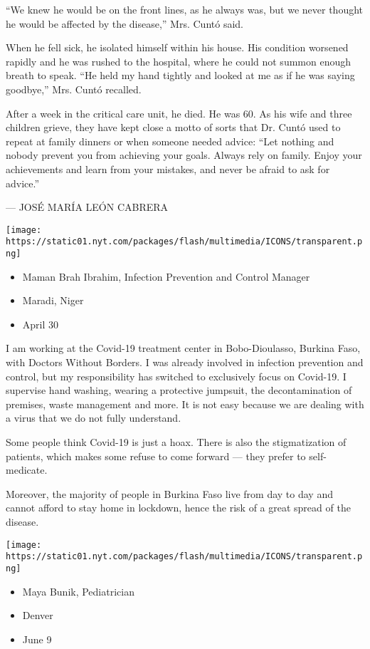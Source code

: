 ``We knew he would be on the front lines, as he always was, but we never
thought he would be affected by the disease,'' Mrs. Cuntó said.

When he fell sick, he isolated himself within his house. His condition
worsened rapidly and he was rushed to the hospital, where he could not
summon enough breath to speak. ``He held my hand tightly and looked at
me as if he was saying goodbye,'' Mrs. Cuntó recalled.

After a week in the critical care unit, he died. He was 60. As his wife
and three children grieve, they have kept close a motto of sorts that
Dr. Cuntó used to repeat at family dinners or when someone needed
advice: ``Let nothing and nobody prevent you from achieving your goals.
Always rely on family. Enjoy your achievements and learn from your
mistakes, and never be afraid to ask for advice.''

--- JOSÉ MARÍA LEÓN CABRERA

\texttt{[image: https://static01.nyt.com/packages/flash/multimedia/ICONS/transparent.png]}

\begin{itemize}
\tightlist
\item
  Maman Brah Ibrahim, Infection Prevention and Control Manager
\item
  Maradi, Niger
\item
  April 30
\end{itemize}

I am working at the Covid-19 treatment center in Bobo-Dioulasso, Burkina
Faso, with Doctors Without Borders. I was already involved in infection
prevention and control, but my responsibility has switched to
exclusively focus on Covid-19. I supervise hand washing, wearing a
protective jumpsuit, the decontamination of premises, waste management
and more. It is not easy because we are dealing with a virus that we do
not fully understand.

Some people think Covid-19 is just a hoax. There is also the
stigmatization of patients, which makes some refuse to come forward ---
they prefer to self-medicate.

Moreover, the majority of people in Burkina Faso live from day to day
and cannot afford to stay home in lockdown, hence the risk of a great
spread of the disease.

\texttt{[image: https://static01.nyt.com/packages/flash/multimedia/ICONS/transparent.png]}

\begin{itemize}
\tightlist
\item
  Maya Bunik, Pediatrician
\item
  Denver
\item
  June 9
\end{itemize}

